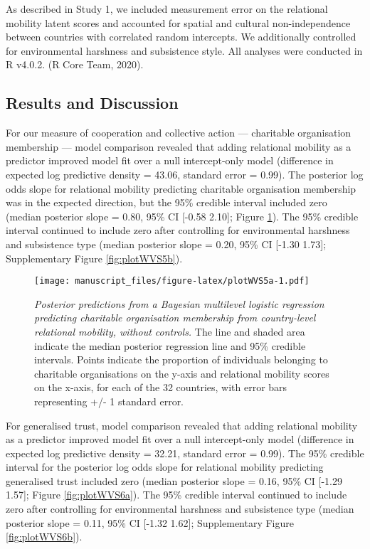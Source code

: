 \documentclass[
  man,floatsintext]{apa6}
\begin{document}
As described in Study 1, we included measurement error on the relational mobility latent scores and accounted for spatial and cultural non-independence between countries with correlated random intercepts. We additionally controlled for environmental harshness and subsistence style. All analyses were conducted in R v4.0.2. (R Core Team, 2020).

\hypertarget{results-and-discussion-1}{%
\subsection{Results and Discussion}\label{results-and-discussion-1}}

For our measure of cooperation and collective action --- charitable organisation membership --- model comparison revealed that adding relational mobility as a predictor improved model fit over a null intercept-only model (difference in expected log predictive density = 43.06, standard error = 0.99). The posterior log odds slope for relational mobility predicting charitable organisation membership was in the expected direction, but the 95\% credible interval included zero (median posterior slope = 0.80, 95\% CI {[}-0.58 2.10{]}; Figure \ref{fig:plotWVS5a}). The 95\% credible interval continued to include zero after controlling for environmental harshness and subsistence type (median posterior slope = 0.20, 95\% CI {[}-1.30 1.73{]}; Supplementary Figure \ref{fig:plotWVS5b}).



\begin{figure}
\centering
\texttt{[image: manuscript\_files/figure-latex/plotWVS5a-1.pdf]}
\caption{\label{fig:plotWVS5a}\emph{Posterior predictions from a Bayesian multilevel logistic regression predicting charitable organisation membership from country-level relational mobility, without controls.} The line and shaded area indicate the median posterior regression line and 95\% credible intervals. Points indicate the proportion of individuals belonging to charitable organisations on the y-axis and relational mobility scores on the x-axis, for each of the 32 countries, with error bars representing +/- 1 standard error.}
\end{figure}

For generalised trust, model comparison revealed that adding relational mobility as a predictor improved model fit over a null intercept-only model (difference in expected log predictive density = 32.21, standard error = 0.99). The 95\% credible interval for the posterior log odds slope for relational mobility predicting generalised trust included zero (median posterior slope = 0.16, 95\% CI {[}-1.29 1.57{]}; Figure \ref{fig:plotWVS6a}). The 95\% credible interval continued to include zero after controlling for environmental harshness and subsistence type (median posterior slope = 0.11, 95\% CI {[}-1.32 1.62{]}; Supplementary Figure \ref{fig:plotWVS6b}).
\end{document}

